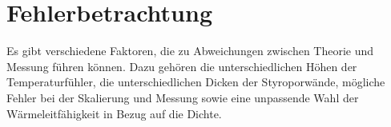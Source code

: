 \section{Fehlerbetrachtung}

Es gibt verschiedene Faktoren, die zu Abweichungen zwischen Theorie und Messung führen können. Dazu gehören die unterschiedlichen Höhen der Temperaturfühler, die unterschiedlichen Dicken der Styroporwände, mögliche Fehler bei der Skalierung und Messung sowie eine unpassende Wahl der Wärmeleitfähigkeit in Bezug auf die Dichte.